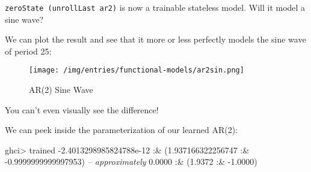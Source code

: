 \documentclass[]{article}
\newenvironment{Shaded}{}{}
\newcommand{\CommentTok}[1]{\textcolor[rgb]{0.38,0.63,0.69}{\textit{#1}}}
\newcommand{\DataTypeTok}[1]{\textcolor[rgb]{0.56,0.13,0.00}{#1}}
\newcommand{\DecValTok}[1]{\textcolor[rgb]{0.25,0.63,0.44}{#1}}
\newcommand{\FloatTok}[1]{\textcolor[rgb]{0.25,0.63,0.44}{#1}}
\newcommand{\FunctionTok}[1]{\textcolor[rgb]{0.02,0.16,0.49}{#1}}
\newcommand{\KeywordTok}[1]{\textcolor[rgb]{0.00,0.44,0.13}{\textbf{#1}}}
\newcommand{\NormalTok}[1]{#1}
\newcommand{\OtherTok}[1]{\textcolor[rgb]{0.00,0.44,0.13}{#1}}
\begin{document}
\texttt{zeroState\ (unrollLast\ ar2)} is now a trainable stateless model. Will
it model a sine wave?

\begin{Shaded}
\end{Shaded}

We can plot the result and see that it more or less perfectly models the sine
wave of period 25:

\begin{figure}
\centering
\texttt{[image: /img/entries/functional-models/ar2sin.png]}
\caption{AR(2) Sine Wave}
\end{figure}

You can't even visually see the difference!

We can peek inside the parameterization of our learned AR(2):

\begin{Shaded}
\begin{Highlighting}[]
\NormalTok{ghci}\FunctionTok{>}\NormalTok{ trained}
\FunctionTok{-}\FloatTok{2.4013298985824788e-12} \FunctionTok{:&}\NormalTok{ (}\FloatTok{1.937166322256747} \FunctionTok{:&} \FunctionTok{-}\FloatTok{0.9999999999997953}\NormalTok{)}
\CommentTok{-- approximately}
\FloatTok{0.0000} \FunctionTok{:&}\NormalTok{ (}\FloatTok{1.9372} \FunctionTok{:&} \FunctionTok{-}\FloatTok{1.0000}\NormalTok{)}
\end{Highlighting}
\end{Shaded}
\end{document}
